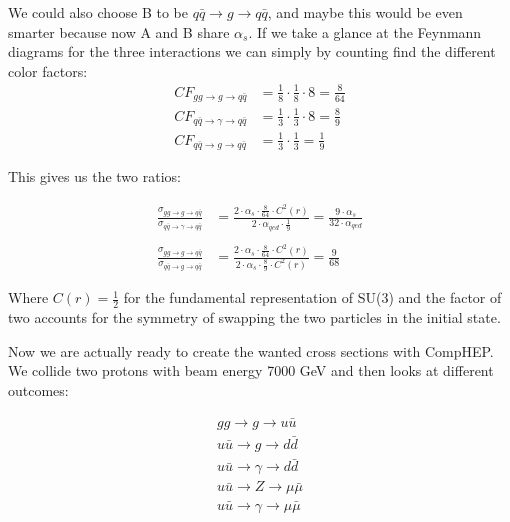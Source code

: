 We could also choose B to be  $q \bar q \rightarrow g \rightarrow q \bar q$, and maybe this would be even smarter because now A and B share $\alpha_{s}$. If we take a glance at the Feynmann diagrams for the three interactions we can simply by counting find the different color factors:
\begin{align}
	CF_{gg \rightarrow g \rightarrow q \bar q}&=\frac{1}{8} \cdot \frac{1}{8} \cdot 8=\frac{8}{64}\\
	CF_{q \bar q \rightarrow \gamma \rightarrow q \bar q}&=\frac{1}{3} \cdot \frac{1}{3} \cdot 8=\frac{8}{9}\\
	CF_{q \bar q \rightarrow g \rightarrow q \bar q}&=\frac{1}{3} \cdot \frac{1}{3}=\frac{1}{9}
\end{align}

This gives us the two ratios:

\begin{align}
	\frac{\sigma_{gg \rightarrow g \rightarrow q \bar q}}{\sigma_{q \bar q \rightarrow \gamma \rightarrow q \bar q}} &=\frac{2 \cdot \alpha_{s} \cdot \frac{8}{64} \cdot C^{2}(r)}{2 \cdot \alpha_{qed} \cdot \frac{1}{9}}=\frac{9 \cdot  \alpha_{s} }{32 \cdot  \alpha_{qed} }\\ \nonumber \\
	\frac{\sigma_{gg \rightarrow g \rightarrow q \bar q}}{\sigma_{q \bar q \rightarrow g \rightarrow q \bar q}} &=\frac{2 \cdot \alpha_{s} \cdot \frac{8}{64} \cdot C^{2}(r)}{2 \cdot \alpha_{s} \cdot \frac{8}{9} \cdot C^{2}(r)}=\frac{9}{68}
\end{align}

Where $C(r) = \frac{1}{2}$ for the fundamental representation of SU(3) and the factor of two accounts for the symmetry of swapping the two particles in the initial state.

Now we are actually ready to create the wanted cross sections with CompHEP. We collide two protons with beam energy 7000 GeV and then looks at different outcomes:

\begin{align}
gg \rightarrow g \rightarrow u \bar u \nonumber \\ \nonumber
u \bar u \rightarrow g \rightarrow d \bar d \\ \nonumber
u \bar u \rightarrow \gamma \rightarrow d \bar d \\ \nonumber
u \bar u \rightarrow Z \rightarrow \mu \bar \mu \\ \nonumber
u \bar u \rightarrow \gamma \rightarrow \mu \bar \mu 
\end{align}

